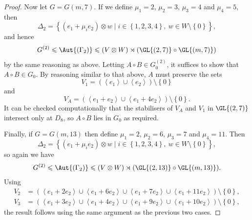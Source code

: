 \begin{proof}
Now let $G = G{\left(m, 7 \right)}$. If we define $\mu_1 = 2$, $\mu_2 = 3$, $\mu_3 = 4$ and $\mu_4 = 5$, then
\begin{displaymath}
    \Delta_2 = {\left\{\left(e_1 + \mu_i e_2 \right) \otimes w \mid i \in {\left\{1, 2, 3, 4 \right\}},\ w \in W \setminus \left\{0 \right\}\right\}},
\end{displaymath}
and hence
\begin{displaymath}
    G^{\left(2 \right)} \leqslant \Aut{\left(\Gamma_2 \right)} \leqslant \left(V \otimes W \right) \rtimes {\left(\GL{\left(2, 7 \right)} \circ \GL{\left(m, 7 \right)}\right)}
\end{displaymath}
by the same reasoning as above. Letting $A \circ B \in G^{\left(2 \right)}_0$, it suffices to show that $A \circ B \in G_0$. By reasoning similar to that above, $A$ must preserve the sets
\begin{displaymath}
    V_1 = \left(\left<e_1 \right> \cup \left<e_2 \right> \right) \setminus \left\{0 \right\}
\end{displaymath}
and
\begin{displaymath}
    V_A = \left(\left<e_1 + e_2 \right> \cup \left<e_1 + 4 e_2 \right> \right) \setminus {\left\{0 \right\}}.
\end{displaymath}
It can be checked computationally that the stabilisers of $V_A$ and $V_1$ in $\GL{\left(2, 7 \right)}$ intersect only at $D_8$, so $A \circ B$ lies in $G_0$ as required.

Finally, if $G = G{\left(m, 13 \right)}$ then define $\mu_1 = 2$, $\mu_2 = 6$, $\mu_3 = 7$ and $\mu_4 = 11$. Then
\begin{displaymath}
    \Delta_2 = {\left\{\left(e_1 + \mu_i e_2 \right) \otimes w \mid i \in {\left\{1, 2, 3, 4 \right\}},\ w \in W \setminus \left\{0 \right\}\right\}},
\end{displaymath}
so again we have
\begin{displaymath}
    G^{\left(2 \right)} \leqslant \Aut{\left(\Gamma_2 \right)} \leqslant \left(V \otimes W \right) \rtimes {\left(\GL{\left(2, 13 \right)} \circ \GL{\left(m, 13 \right)}\right)}.
\end{displaymath}
Using
\begin{align*}
    V_2 &= \left(\left<e_1 + 2 e_2 \right> \cup \left<e_1 + 6 e_2 \right> \cup \left<e_1 + 7 e_2 \right> \cup \left<e_1 + 11 e_2 \right> \right) \setminus {\left\{0 \right\}}, \\
    V_3 &= \left(\left<e_1 + 3 e_2 \right> \cup \left<e_1 + 4 e_2 \right> \cup \left<e_1 + 9 e_2 \right> \cup \left<e_1 + 10 e_2 \right> \right) \setminus {\left\{0 \right\}},
\end{align*}
the result follows using the same argument as the previous two cases.
\end{proof}

